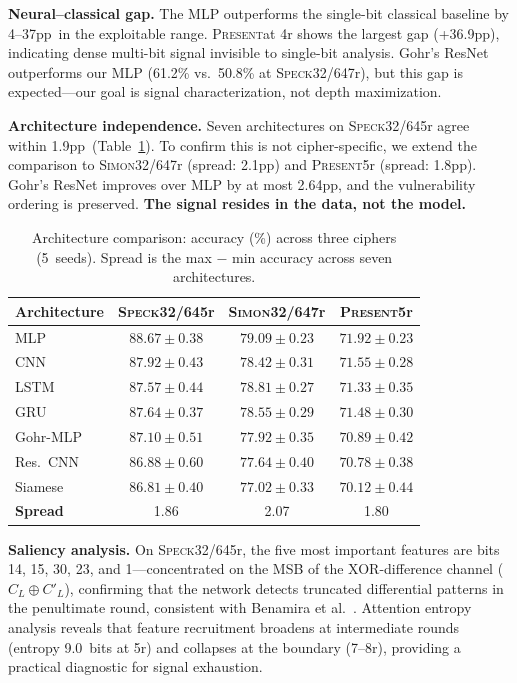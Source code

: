\documentclass[runningheads]{llncs}
\newcommand{\speck}{\textsc{Speck32/64}}
\newcommand{\simon}{\textsc{Simon32/64}}
\newcommand{\present}{\textsc{Present}}
\newcommand{\pp}{pp}
\begin{document}
\textbf{Neural--classical gap.}
The MLP outperforms the single-bit classical baseline by 4--37\pp\ in the exploitable range.
\present at 4r shows the largest gap (+36.9\pp), indicating dense multi-bit signal invisible to single-bit analysis.
Gohr's ResNet outperforms our MLP (61.2\% vs.\ 50.8\% at \speck 7r), but this gap is expected---our goal is signal characterization, not depth maximization.

\textbf{Architecture independence.}
Seven architectures on \speck 5r agree within 1.9\pp\ (Table~\ref{tab:arch}).
To confirm this is not cipher-specific, we extend the comparison to \simon 7r (spread: 2.1\pp) and \present 5r (spread: 1.8\pp).
Gohr's ResNet improves over MLP by at most 2.64\pp, and the vulnerability ordering is preserved.
\textbf{The signal resides in the data, not the model.}

\begin{table}[htbp]
\centering
\caption{Architecture comparison: accuracy (\%) across three ciphers (5~seeds). Spread is the max $-$ min accuracy across seven architectures.}\label{tab:arch}
\begin{tabular}{@{}lccc@{}}
\toprule
\textbf{Architecture} & \textbf{\speck 5r} & \textbf{\simon 7r} & \textbf{\present 5r} \\
\midrule
MLP           & $88.67 \pm 0.38$ & $79.09 \pm 0.23$ & $71.92 \pm 0.23$ \\
CNN           & $87.92 \pm 0.43$ & $78.42 \pm 0.31$ & $71.55 \pm 0.28$ \\
LSTM          & $87.57 \pm 0.44$ & $78.81 \pm 0.27$ & $71.33 \pm 0.35$ \\
GRU           & $87.64 \pm 0.37$ & $78.55 \pm 0.29$ & $71.48 \pm 0.30$ \\
Gohr-MLP      & $87.10 \pm 0.51$ & $77.92 \pm 0.35$ & $70.89 \pm 0.42$ \\
Res.~CNN      & $86.88 \pm 0.60$ & $77.64 \pm 0.40$ & $70.78 \pm 0.38$ \\
Siamese       & $86.81 \pm 0.40$ & $77.02 \pm 0.33$ & $70.12 \pm 0.44$ \\
\midrule
\textbf{Spread} & 1.86 & 2.07 & 1.80 \\
\bottomrule
\end{tabular}
\end{table}

\textbf{Saliency analysis.}
On \speck 5r, the five most important features are bits 14, 15, 30, 23, and 1---concentrated on the MSB of the XOR-difference channel ($C_L \oplus C'_L$), confirming that the network detects truncated differential patterns in the penultimate round, consistent with Benamira et al.~\cite{benamira2021deeper}.
Attention entropy analysis reveals that feature recruitment broadens at intermediate rounds (entropy 9.0~bits at 5r) and collapses at the boundary (7--8r), providing a practical diagnostic for signal exhaustion.
\end{document}
